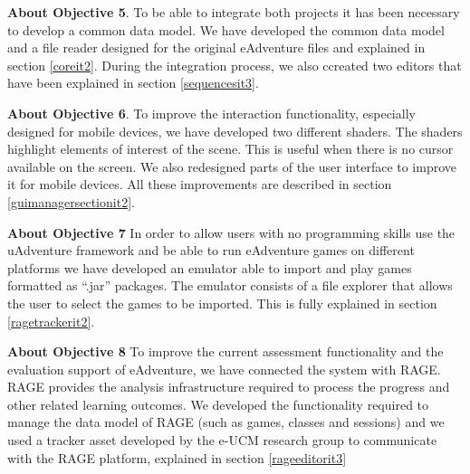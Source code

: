 \textbf{About Objective 5}. To be able to integrate both projects it has been necessary to develop a common data model. We have developed the common data model and a file reader designed for the original eAdventure files and explained in section \ref{coreit2}. During the integration process, we also ccreated two editors that have been explained in section \ref{sequencesit3}.

\textbf{About Objective 6}. To improve the interaction functionality, especially designed for mobile devices, we have developed two different shaders. The shaders highlight elements of interest of the scene. This is useful when there is no cursor available on the screen. We also redesigned parts of the user interface to improve it for mobile devices. All these improvements are described in section \ref{guimanagersectionit2}.

\textbf{About Objective 7} In order to allow users with no programming skills use the uAdventure framework and be able to run eAdventure games on different platforms we have developed an emulator able to import and play games formatted as “.jar” packages. The emulator consists of a file explorer that allows the user to select the games to be imported. This is fully explained in section \ref{ragetrackerit2}.

\textbf{About Objective 8} To improve the current assessment functionality and the evaluation support of eAdventure, we have connected the system with RAGE. RAGE provides the analysis infrastructure required to process the progress and other related learning outcomes. We developed the functionality required to manage the data model of RAGE (such as games, classes and sessions) and we used a tracker asset developed by the e-UCM research group to communicate with the RAGE platform, explained in section \ref{rageeditorit3} 



